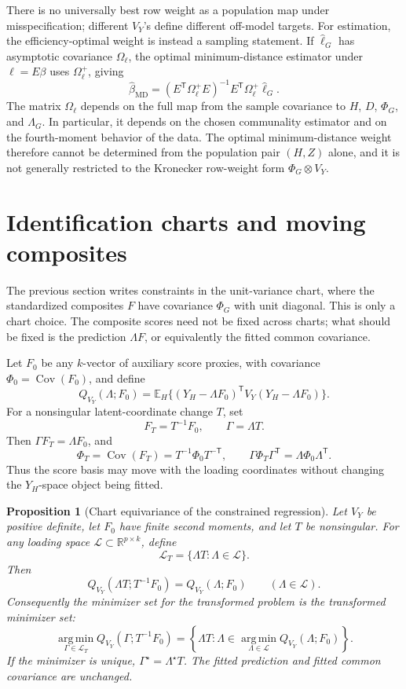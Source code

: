 \documentclass[11pt]{article}
\newcommand{\T}{^{\mathsf T}}
\newcommand{\E}{\mathbb{E}}
\newcommand{\Cov}{\operatorname{Cov}}
\newcommand{\argmin}{\operatorname*{arg\,min}}
\theoremstyle{plain}
\newtheorem{proposition}{Proposition}
\theoremstyle{remark}
\begin{document}
There is no universally best row weight as a population map under
misspecification; different \(V_Y\)'s define different off-model targets. For
estimation, the efficiency-optimal weight is instead a sampling statement. If
\(\hat\ell_G\) has asymptotic covariance \(\Omega_\ell\), the optimal
minimum-distance estimator under \(\ell=E\beta\) uses
\(\Omega_\ell^{+}\), giving
\[
  \hat\beta_{\mathrm{MD}}
  =
  (E\T\Omega_\ell^{+}E)^{-1}E\T\Omega_\ell^{+}\hat\ell_G .
\]
The matrix \(\Omega_\ell\) depends on the full map from the sample covariance
to \(H\), \(D\), \(\Phi_G\), and \(\Lambda_G\). In particular, it depends on the
chosen communality estimator and on the fourth-moment behavior of the data.
The optimal minimum-distance weight therefore cannot be determined from the
population pair \((H,Z)\) alone, and it is not generally restricted to the
Kronecker row-weight form \(\Phi_G\otimes V_Y\).

\section{Identification charts and moving composites}

The previous section writes constraints in the unit-variance chart, where the
standardized composites \(F\) have covariance \(\Phi_G\) with unit diagonal.
This is only a chart choice. The composite scores need not be fixed across
charts; what should be fixed is the prediction \( \Lambda F \), or equivalently
the fitted common covariance.

Let \(F_0\) be any \(k\)-vector of auxiliary score proxies, with covariance
\(\Phi_0=\Cov(F_0)\), and define
\[
  Q_{V_Y}(\Lambda;F_0)
  =
  \E_H\{(Y_H-\Lambda F_0)\T V_Y(Y_H-\Lambda F_0)\}.
\]
For a nonsingular latent-coordinate change \(T\), set
\[
  F_T=T^{-1}F_0,
  \qquad
  \Gamma=\Lambda T .
\]
Then \(\Gamma F_T=\Lambda F_0\), and
\[
  \Phi_T=\Cov(F_T)=T^{-1}\Phi_0T^{-\mathsf T},
  \qquad
  \Gamma\Phi_T\Gamma\T=\Lambda\Phi_0\Lambda\T .
\]
Thus the score basis may move with the loading coordinates without changing
the \(Y_H\)-space object being fitted.

\begin{proposition}[Chart equivariance of the constrained regression]
\label{prop:chart-equivariance}
Let \(V_Y\) be positive definite, let \(F_0\) have finite second moments, and
let \(T\) be nonsingular. For any loading space
\(\mathcal L\subset\mathbb R^{p\times k}\), define
\[
  \mathcal L_T=\{\Lambda T:\Lambda\in\mathcal L\}.
\]
Then
\[
  Q_{V_Y}(\Lambda T;T^{-1}F_0)
  =
  Q_{V_Y}(\Lambda;F_0)
  \qquad(\Lambda\in\mathcal L).
\]
Consequently the minimizer set for the transformed problem is the transformed
minimizer set:
\[
  \argmin_{\Gamma\in\mathcal L_T}
    Q_{V_Y}(\Gamma;T^{-1}F_0)
  =
  \left\{\Lambda T:
    \Lambda\in\argmin_{\Lambda\in\mathcal L}Q_{V_Y}(\Lambda;F_0)
  \right\}.
\]
If the minimizer is unique, \(\Gamma^\star=\Lambda^\star T\). The fitted
prediction and fitted common covariance are unchanged.
\end{proposition}
\end{document}
